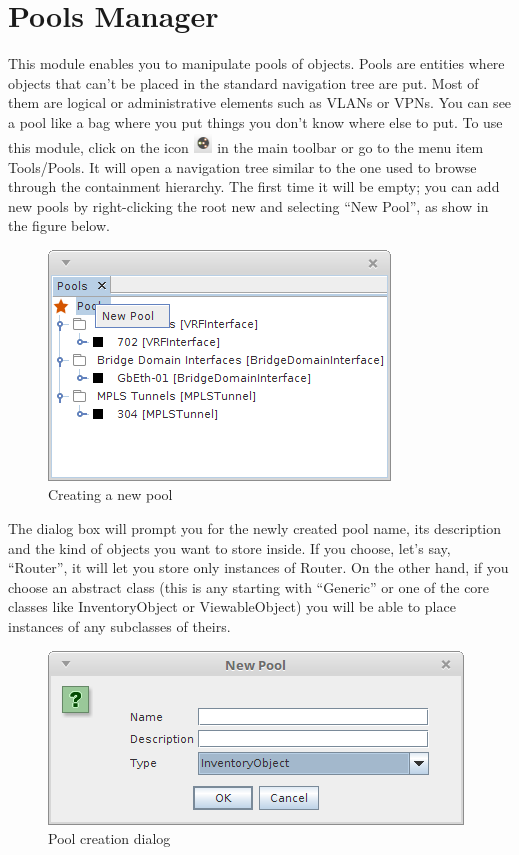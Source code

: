 \documentclass[a4paper]{article}
\begin{document}
	\newpage
	\section{Pools Manager} \label{sec:pools_manager}
	This module enables you to manipulate pools of objects. Pools are entities where objects that can't be placed in the standard navigation tree are put. Most of them are logical or administrative elements such as VLANs or VPNs. You can see a pool like a bag where you put things you don't know where else to put. To use this module, click on the icon  \includegraphics[width=0.5cm]{img/icon_pools_manager.png} in the main toolbar or go to the menu item Tools/Pools. It will open a navigation tree similar to the one used to browse through the containment hierarchy. The first time it will be empty; you can add new pools by right-clicking the root new and selecting “New Pool”, as show in the figure below.
	\begin{figure}[h!]
		\centering
		\includegraphics[width=0.5\linewidth]{img/pools_actions.png}
		\caption{Creating a new pool}
		\label{fig:pools_actions}
	\end{figure}
	
	The dialog box will prompt you for the newly created pool name, its description and the kind of objects  you want to store inside. If you choose, let's say, “Router”, it will let you store only instances of Router. On the other hand, if you choose an abstract class (this is any starting with “Generic” or one of the core classes like InventoryObject or ViewableObject) you will be able to place instances of any subclasses of theirs. 
	\begin{figure}[h!]
		\centering
		\includegraphics[width=0.5\linewidth]{img/pools_create_new_pool.png}
		\caption{Pool creation dialog}
		\label{fig:pools_create_new_pool}
	\end{figure}
	
\end{document}
